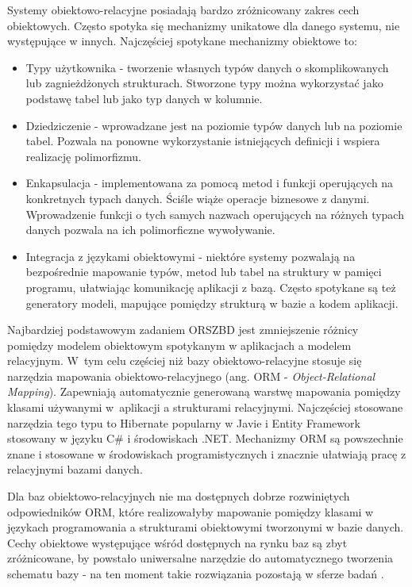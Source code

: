 \documentclass[a4paper,twoside,12pt]{book}
\begin{document}
Systemy obiektowo-relacyjne posiadają bardzo zróżnicowany zakres cech obiektowych. Często spotyka się mechanizmy unikatowe dla danego systemu, nie występujące w innych. Najczęściej spotykane mechanizmy obiektowe to:
\begin{itemize}
    \item Typy użytkownika - tworzenie własnych typów danych o skomplikowanych lub zagnieżdżonych strukturach. Stworzone typy można wykorzystać jako podstawę tabel lub jako typ danych w kolumnie.
    \item Dziedziczenie - wprowadzane jest na poziomie typów danych lub na poziomie tabel. Pozwala na ponowne wykorzystanie istniejących definicji i wspiera realizację polimorfizmu.
    \item Enkapsulacja - implementowana za pomocą metod i funkcji operujących na konkretnych typach danych. Ściśle wiąże operacje biznesowe z danymi. Wprowadzenie funkcji o tych samych nazwach operujących na różnych typach danych pozwala na ich polimorficzne wywoływanie.
    \item Integracja z językami obiektowymi - niektóre systemy pozwalają na bezpośrednie mapowanie typów, metod lub tabel na struktury w pamięci programu, ułatwiając komunikację aplikacji z bazą. Często spotykane są też generatory modeli, mapujące pomiędzy strukturą w bazie a kodem aplikacji.
\end{itemize}

Najbardziej podstawowym zadaniem ORSZBD jest zmniejszenie różnicy pomiędzy modelem obiektowym spotykanym w aplikacjach a modelem relacyjnym. W~tym celu częściej niż bazy obiektowo-relacyjne stosuje się narzędzia mapowania obiektowo-relacyjnego (ang. ORM - \textit{Object-Relational Mapping}). Zapewniają automatycznie generowaną warstwę mapowania pomiędzy klasami używanymi w~aplikacji a strukturami relacyjnymi. Najczęściej stosowane narzędzia tego typu to Hibernate popularny w Javie i Entity Framework stosowany w języku C\# i środowiskach .NET. Mechanizmy ORM są powszechnie znane i stosowane w środowiskach programistycznych i znacznie ułatwiają pracę z relacyjnymi bazami danych.

Dla baz obiektowo-relacyjnych nie ma dostępnych dobrze rozwiniętych odpowiedników ORM, które realizowałyby mapowanie pomiędzy klasami w językach programowania a strukturami obiektowymi tworzonymi w bazie danych. Cechy obiektowe występujące wśród dostępnych na rynku baz są zbyt zróżnicowane, by powstało uniwersalne narzędzie do automatycznego tworzenia schematu bazy - na ten moment takie rozwiązania pozostają w sferze badań \cite{bib:o-odm-framework}.
\end{document}
